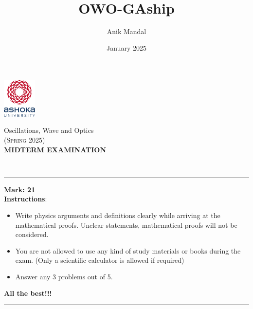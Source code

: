 \documentclass[12pt, a4paper]{article}
\title{OWO-GAship}
\author{Anik Mandal}
\date{January 2025}
\begin{document}
\begin{minipage}[t][][c]{0.1\textwidth}
    \begin{flushleft}
        \includegraphics[height=2cm]{tex-resources/Ashoka Logo.png}
    \end{flushleft}
\end{minipage}
\begin{minipage}[t][][c]{0.85\textwidth}
    \begin{center}
        {\LARGE Oscillations, Wave and Optics}\\ \vspace{0.5em}
        \textsc{(Spring 2025)}\\
        \vspace{1em}
        \textbf{\Large MIDTERM EXAMINATION} \\
    \end{center}
\end{minipage}
\vspace{20pt}\\
\rule[0em]{\textwidth}{0.75pt}

\hfill
{}\hfill
\textbf{\large 
Mark: 21}\\

\textbf{Instructions}:
\begin{itemize}
    \item Write physics arguments and definitions clearly while arriving at the mathematical proofs.
    Unclear statements, mathematical proofs will not be considered. 
    \item You are not allowed to use any kind of study materials or books during the exam.
    (Only a scientific calculator is allowed if required)
    \item Answer any 3 problems out of 5.
\end{itemize}
\begin{center}
    \textbf{All the best!!!}
\end{center}
\rule[0em]{\textwidth}{1.75pt}
\vspace{-1cm}

\justifying
\end{document}
